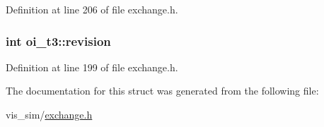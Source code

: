 Definition at line 206 of file exchange.h.

\hypertarget{structoi__t3_ad167447275dd252665cd6488e9947c4c}{
\subsubsection[{revision}]{\setlength{\rightskip}{0pt plus 5cm}int {\bf oi\_\-t3::revision}}}
\label{structoi__t3_ad167447275dd252665cd6488e9947c4c}


Definition at line 199 of file exchange.h.



The documentation for this struct was generated from the following file:\begin{DoxyCompactItemize}
\item 
vis\_\-sim/\hyperlink{exchange_8h}{exchange.h}\end{DoxyCompactItemize}
